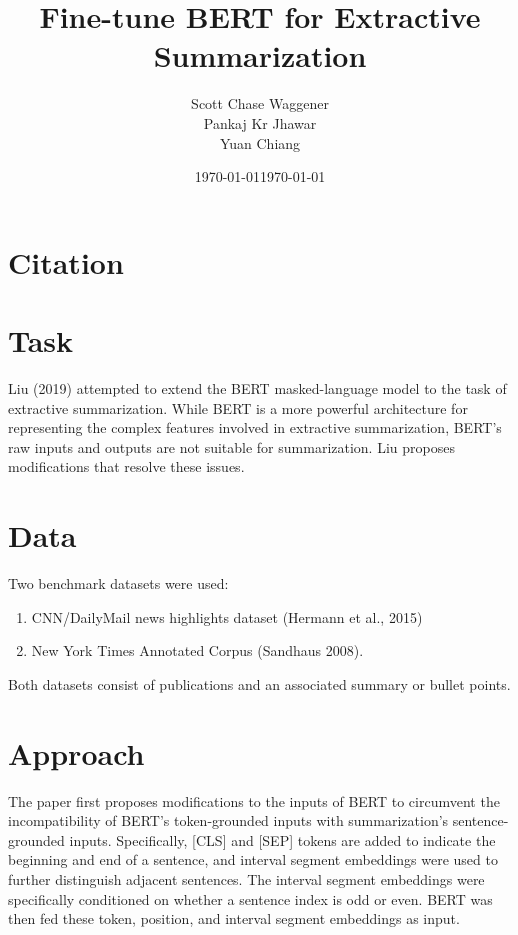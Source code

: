 \documentclass[12pt]{article}
\title{Fine-tune BERT for Extractive Summarization}
\author{
		Scott Chase Waggener \\
		Pankaj Kr Jhawar \\
		Yuan Chiang \\
}
\date{\today}
\date{\today}
\begin{document}
\maketitle

\section{Citation}
\nocite{*}
\printbibliography

\section{Task}

Liu (2019) attempted to extend the BERT masked-language model to the
task of extractive summarization. While BERT is a more powerful
architecture for representing the complex features involved in
extractive summarization, BERT's raw inputs and outputs are not
suitable for summarization. Liu proposes modifications that resolve
these issues.

\section{Data}

Two benchmark datasets were used:
\begin{enumerate}
	\item CNN/DailyMail news highlights dataset (Hermann et al., 2015)
	\item New York Times Annotated Corpus (Sandhaus 2008).
\end{enumerate}

\noindent
Both datasets consist of publications and an
associated summary or bullet points.

\section{Approach}

The paper first proposes modifications to the inputs of BERT to
circumvent the incompatibility of BERT's token-grounded inputs with
summarization's sentence-grounded inputs. Specifically, [CLS] and
[SEP] tokens are added to indicate the beginning and end of a
sentence, and interval segment embeddings were used to further
distinguish adjacent sentences. The interval segment embeddings were
specifically conditioned on whether a sentence index is odd or even.
BERT was then fed these token, position, and interval segment
embeddings as input.
\end{document}
